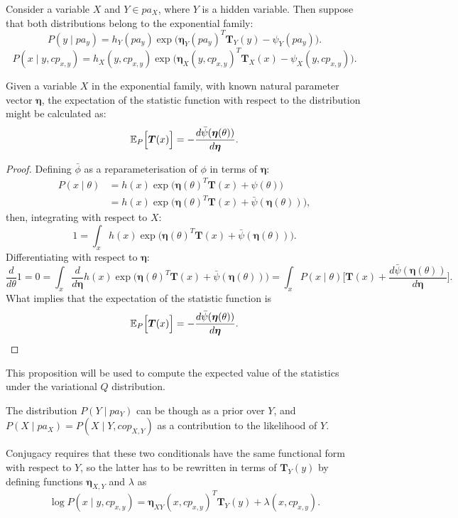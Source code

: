 Consider a variable \( X \) and \( Y \in pa_X \), where \( Y \) is a hidden variable. Then suppose that both distributions belong to the exponential family:
\[
     P(y \mid pa_y) = h_Y(pa_y)\exp \Big( {\bm{\eta}_Y(pa_y)}^T\bm{T}_Y(y) - \psi_Y(pa_y) \Big).
\]
\[
P(x \mid y,cp_{x,y}) = h_X(y, cp_{x,y})\exp \Big( {\bm{\eta}_X(y, cp_{x,y})}^T\bm{T}_X(x) - \psi_X(y, cp_{x,y}) \Big).
\]

\begin{proposition}\label{prop:vmp}
  Given a variable \(X\) in the exponential family, with known natural parameter vector \(\bm{\eta}\),  the expectation of the statistic function with respect to the distribution might be calculated as:
    \[
    \mathbb{E}_{P}\Big[\bm{T}(x)\Big] =   -  \frac{ d\bar{\psi}(\bm{\eta}(\theta)) }{d \bm{\eta}}.
  \]
\end{proposition}
\begin{proof}
  Defining \(\bar{\phi}\) as a reparameterisation of \(\phi\) in terms of \(\bm{\eta}\):
  \[
    \begin{aligned}
      P(x\mid \theta) &= h(x)\exp \Big( \bm{\eta}{(\theta)}^{T}\bm{T}(x) + \psi(\theta) \Big)\\
       &= h(x)\exp \Big( \bm{\eta}{(\theta)}^{T}\bm{T}(x) + \bar{\psi}(\bm{\eta}(\theta)) \Big),
    \end{aligned}
  \]
  then, integrating with respect to \(X\):
  \[
    1 = \int_{x} h(x)\exp \Big( \bm{\eta}{(\theta)}^{T}\bm{T}(x) + \bar{\psi}(\bm{\eta}(\theta)) \Big).
  \]
  Differentiating with respect to \(\bm{\eta}\):
  \[
    \frac{d}{d\theta}1 = 0 = \int_{x} \frac{d}{d\bm{\eta}}h(x)\exp \Big( \bm{\eta}{(\theta)}^{T}\bm{T}(x) + \bar{\psi}(\bm{\eta}(\theta)) \Big) = \int_{x}P(x \mid \theta)\Big[ \bm{T}(x) + \frac{ d\bar{\psi}(\bm{\eta}(\theta)) }{d \bm{\eta}}\Big].
  \]
  What implies that the expectation of the statistic function is
  \[
    \mathbb{E}_{P}\Big[\bm{T}(x)\Big] =   -  \frac{ d\bar{\psi}(\bm{\eta}(\theta)) }{d \bm{\eta}}.
  \]
\end{proof}

This proposition will be used to compute the expected value of the statistics under the variational \(Q\) distribution.


The distribution \( P(Y \mid pa_Y) \) can be though as a prior over \( Y \), and \( P(X \mid pa_X) = P(X \mid Y, cop_{X,Y})\) as a contribution to the likelihood of \( Y \).

Conjugacy requires that these two conditionals have the same functional form with respect to \( Y \), so the latter has to be rewritten in terms of \( \bm{T}_Y (y)\) by defining functions \( \bm{\eta}_{X,Y} \) and \( \lambda \) as
\[
     \log P(x \mid y , cp_{x,y}) = \bm{\eta}_{XY}(x, cp_{x,y})^T \bm{T}_Y(y) + \lambda(x, cp_{x,y}).
\]

